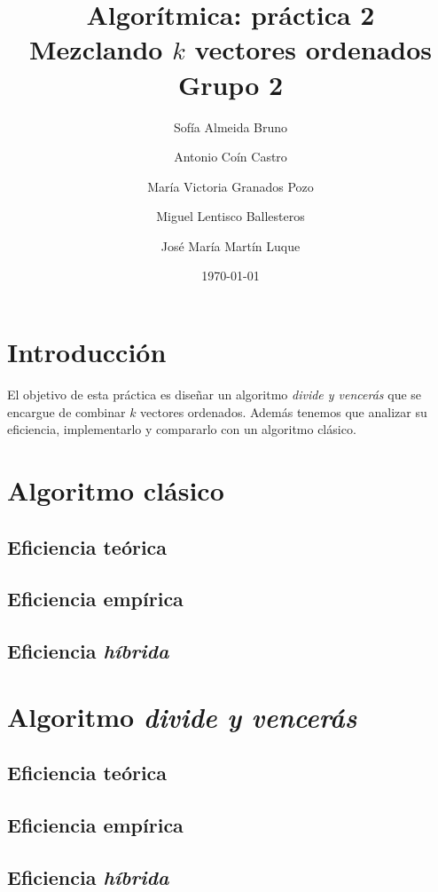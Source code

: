 \documentclass[11pt]{article}
\title{Algorítmica: práctica 2 \\ \large Mezclando $k$ vectores ordenados\\ \vspace{0.2em}Grupo 2}
\author{Sofía Almeida Bruno \and Antonio Coín Castro \and María Victoria Granados Pozo \and Miguel Lentisco Ballesteros \and José María Martín Luque}
\date{\today}
\begin{document}
\maketitle

\newpage

\section*{Introducción}

El objetivo de esta práctica es diseñar un algoritmo \textit{divide y vencerás}
que se encargue de combinar $k$ vectores ordenados. Además tenemos que analizar
su eficiencia, implementarlo y compararlo con un algoritmo clásico.

\section*{Algoritmo clásico}



\subsection*{Eficiencia teórica}

\subsection*{Eficiencia empírica}

\subsection*{Eficiencia \textit{híbrida}}

\section*{Algoritmo \textit{divide y vencerás}}

\subsection*{Eficiencia teórica}

\subsection*{Eficiencia empírica}

\subsection*{Eficiencia \textit{híbrida}}
\end{document}
